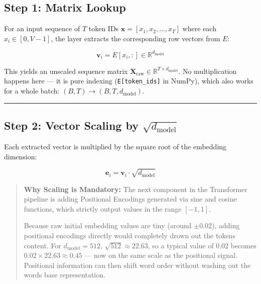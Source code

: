 \documentclass[11pt,a4paper,oneside]{report}
\begin{document}
\subsection{Step 1: Matrix Lookup}\label{step-1-matrix-lookup}

For an input sequence of \(T\) token IDs \(\mathbf{x} = [x_1, x_2, \dots, x_T]\) where each \(x_i \in [0, V-1]\), the layer extracts the corresponding row vectors from \(E\):

\[\mathbf{v}_i = E[x_i, :] \in \mathbb{R}^{d_{\text{model}}}\]

This yields an unscaled sequence matrix \(\mathbf{X}_{\text{raw}} \in \mathbb{R}^{T \times d_{\text{model}}}\). No multiplication happens here --- it is pure indexing (\texttt{E{[}token\_ids{]}} in NumPy), which also works for a whole batch: \((B, T) \rightarrow (B, T, d_{\text{model}})\).

\begin{center}\rule{0.5\linewidth}{0.5pt}\end{center}

\subsection{\texorpdfstring{Step 2: Vector Scaling by \(\sqrt{d_{\text{model}}}\)}{Step 2: Vector Scaling by \textbackslash sqrt\{d\_\{\textbackslash text\{model\}\}\}}}\label{step-2-vector-scaling-by-sqrtd_textmodel}

Each extracted vector is multiplied by the square root of the embedding dimension:

\[\mathbf{e}_i = \mathbf{v}_i \cdot \sqrt{d_{\text{model}}}\]

\begin{quote}
\textbf{Why Scaling is Mandatory:}
The next component in the Transformer pipeline is adding Positional Encodings generated via sine and cosine functions, which strictly output values in the range \([-1, 1]\).

Because raw initial embedding values are tiny (around \(\pm 0.02\)), adding positional encodings directly would completely drown out the token\textquotesingle s content. For \(d_{\text{model}} = 512\), \(\sqrt{512} \approx 22.63\), so a typical value of \(0.02\) becomes \(0.02 \times 22.63 \approx 0.45\) --- now on the same scale as the positional signal. Positional information can then shift word order without washing out the word\textquotesingle s base representation.
\end{quote}
\end{document}
